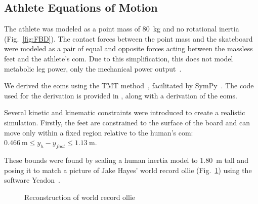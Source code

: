 \documentclass[default,iicol]{sn-jnl}
\begin{document}
\subsection{Athlete Equations of Motion}
The athlete was modeled as a point mass of \SI{80}{\kilo\gram} and no rotational inertia (Fig.~\ref{fig:FBD}).
The contact forces between the point mass and the skateboard were modeled as a pair of equal and opposite forces acting between the massless feet and the athlete's \acrfull{com}.
Due to this simplification, this does not model metabolic leg power, only the mechanical power output~\cite{van_der_kruk_power_2018,morin_biomechanics_2018}.

We derived the \glspl{eom} using the TMT method~\cite{vallery_heike_advanced_2018}, facilitated by SymPy~\cite{meurer_sympy_2017}.
The code used for the derivation is provided in \cite{heinen_optimal_2022}, along with a derivation of the \glspl{eom}.

Several kinetic and kinematic constraints were introduced to create a realistic simulation. Firstly, the feet are constrained to the surface of the board and can move only within a fixed region relative to the human’s \gls{com}: $\SI{0.466}{\meter} \leq y_h - y_{foot} \leq \SI{1.13}{\meter}$.

These bounds were found by scaling a human inertia model to \SI{1.80}{\meter} tall and posing it to match a picture of Jake Hayes' world record ollie  (Fig.~\ref{fig:f_record}) using the software Yeadon~\cite{Dembia2015}. 

\begin{figure}
    \centering
    \quad
    \caption{Reconstruction of world record ollie} 
    \label{fig:f_record}
\end{figure}
\end{document}
